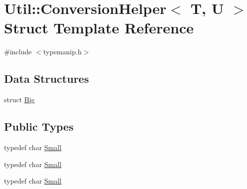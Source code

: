 \hypertarget{structUtil_1_1Private_1_1ConversionHelper}{}\section{Util\+:\+:Conversion\+Helper$<$ T, U $>$ Struct Template Reference}
\label{structUtil_1_1Private_1_1ConversionHelper}


{\ttfamily \#include $<$typemanip.\+h$>$}

\subsection*{Data Structures}
\begin{DoxyCompactItemize}
\item 
struct \mbox{\hyperlink{structUtil_1_1Private_1_1ConversionHelper_1_1Big}{Big}}
\end{DoxyCompactItemize}
\subsection*{Public Types}
\begin{DoxyCompactItemize}
\item 
typedef char \mbox{\hyperlink{structUtil_1_1Private_1_1ConversionHelper_aaaf6583019b5246d4676b56923632385}{Small}}
\item 
typedef char \mbox{\hyperlink{structUtil_1_1Private_1_1ConversionHelper_aaaf6583019b5246d4676b56923632385}{Small}}
\item 
typedef char \mbox{\hyperlink{structUtil_1_1Private_1_1ConversionHelper_aaaf6583019b5246d4676b56923632385}{Small}}
\end{DoxyCompactItemize}
